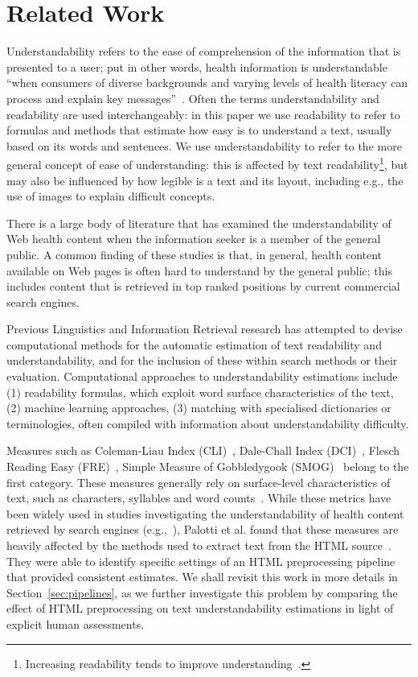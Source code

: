 \section{Related Work}
\label{sec:related}
Understandability refers to the ease of comprehension of the information that is presented to a user; put in other words, health information is understandable ``when consumers of diverse backgrounds and varying levels of health literacy can process and explain key messages''~\cite{shoemaker2014development}. Often the terms understandability and readability are used interchangeably: in this paper we use readability to refer to formulas and methods that estimate how easy is to understand a text, usually based on its words and sentences. We use understandability to refer to the more general concept of ease of understanding: this is affected by text readability\footnote{Increasing readability tends to improve understanding~\cite{ley1996use}.}, but may also be influenced by how legible is a text and its layout, including e.g., the use of images to explain difficult concepts.

There is a large body of literature that has examined the understandability of Web health content when the information seeker is a member of the general public. 
A common finding of these studies is that, in general, health content available on Web pages is often hard to understand by the general public; this includes content that is retrieved in top ranked positions by current commercial search engines.

Previous Linguistics and Information Retrieval research has attempted to devise computational methods for the automatic estimation of text readability and understandability, and for the inclusion of these within search methods or their evaluation. Computational approaches to understandability estimations include (1) readability formulas, which exploit word surface characteristics of the text, (2) machine learning approaches, (3) matching with specialised dictionaries or terminologies, often compiled with information about understandability difficulty.

Measures such as Coleman-Liau Index (CLI)~\cite{cli75}, Dale-Chall Index (DCI)~\cite{dale48}, Flesch Reading Easy (FRE)~\cite{flesch75}, Simple Measure of Gobbledygook (SMOG)~\cite{smog69} belong to the first category. These measures generally rely on surface-level characteristics of text, such as characters, syllables and word counts~\cite{dubay04}.
While these metrics have been widely used in studies investigating the understandability of health content retrieved by search engines (e.g.,~\cite{becker2004study,graber99readability,fitzsimmons2010readability,wiener2013readability,patel13readability,atcherson14readability,meillier17readability}), Palotti et al. found that these measures are heavily affected by the methods used to extract text from the HTML source~\cite{palotti15}. They were able to identify specific settings of an HTML preprocessing pipeline that provided consistent  estimates. We shall revisit this work in more details in Section~\ref{sec:pipelines}, as we further investigate this problem by comparing the effect of HTML preprocessing on text understandability estimations in light of explicit human assessments. 

